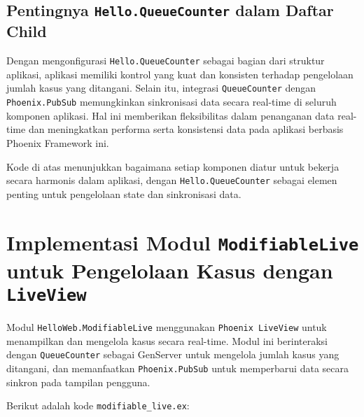 \subsection{Pentingnya \texttt{Hello.QueueCounter} dalam Daftar Child}
Dengan mengonfigurasi \texttt{Hello.QueueCounter} sebagai bagian dari struktur aplikasi, aplikasi memiliki kontrol yang kuat dan konsisten terhadap pengelolaan jumlah kasus yang ditangani. Selain itu, integrasi \texttt{QueueCounter} dengan \texttt{Phoenix.PubSub} memungkinkan sinkronisasi data secara real-time di seluruh komponen aplikasi. Hal ini memberikan fleksibilitas dalam penanganan data real-time dan meningkatkan performa serta konsistensi data pada aplikasi berbasis Phoenix Framework ini.

Kode di atas menunjukkan bagaimana setiap komponen diatur untuk bekerja secara harmonis dalam aplikasi, dengan \texttt{Hello.QueueCounter} sebagai elemen penting untuk pengelolaan state dan sinkronisasi data.


\section{Implementasi Modul \texttt{ModifiableLive} untuk Pengelolaan Kasus dengan \texttt{LiveView}}

Modul \texttt{HelloWeb.ModifiableLive} menggunakan \texttt{Phoenix LiveView} untuk menampilkan dan mengelola kasus secara real-time. Modul ini berinteraksi dengan \texttt{QueueCounter} sebagai GenServer untuk mengelola jumlah kasus yang ditangani, dan memanfaatkan \texttt{Phoenix.PubSub} untuk memperbarui data secara sinkron pada tampilan pengguna. 

Berikut adalah kode \texttt{modifiable\_live.ex}:

